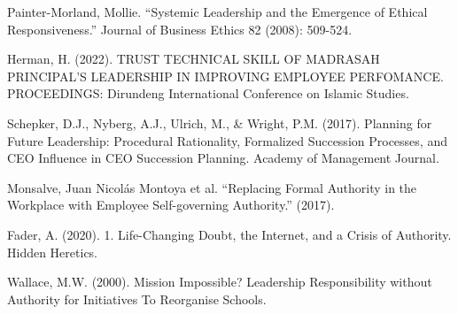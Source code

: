 \documentclass[runningheads]{llncs}
\begin{document}
\newpage

%
%
%
% 
% 
%
\begin{thebibliography}{10}




Painter-Morland, Mollie. “Systemic Leadership and the Emergence of Ethical Responsiveness.” Journal of Business Ethics 82 (2008): 509-524.

Herman, H. (2022). TRUST TECHNICAL SKILL OF MADRASAH PRINCIPAL’S LEADERSHIP IN IMPROVING EMPLOYEE PERFOMANCE. PROCEEDINGS: Dirundeng International Conference on Islamic Studies.

Schepker, D.J., Nyberg, A.J., Ulrich, M., \& Wright, P.M. (2017). Planning for Future Leadership: Procedural Rationality, Formalized Succession Processes, and CEO Influence in CEO Succession Planning. Academy of Management Journal.

Monsalve, Juan Nicolás Montoya et al. “Replacing Formal Authority in the Workplace with Employee Self-governing Authority.” (2017).

Fader, A. (2020). 1. Life-Changing Doubt, the Internet, and a Crisis of Authority. Hidden Heretics.

Wallace, M.W. (2000). Mission Impossible? Leadership Responsibility without Authority for Initiatives To Reorganise Schools.


\end{thebibliography}
\end{document}
